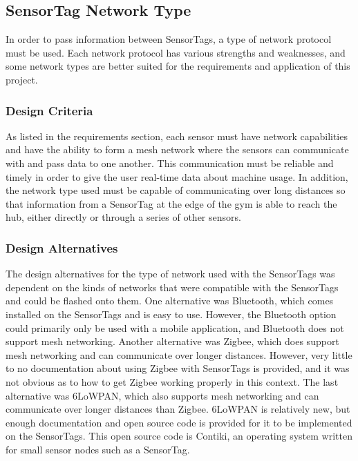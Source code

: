 \documentclass[PPFS.tex]{template/subfiles}
\begin{document}
\subsection{SensorTag Network Type}
In order to pass information between SensorTags, a type of network protocol must be used. Each network protocol has various strengths and weaknesses, and some network types are better suited for the requirements and application of this project.

\subsubsection{Design Criteria}
As listed in the requirements section, each sensor must have network capabilities and have the ability to form a mesh network where the sensors can communicate with and pass data to one another. This communication must be reliable and timely in order to give the user real-time data about machine usage. In addition, the network type used must be capable of communicating over long distances so that information from a SensorTag at the edge of the gym is able to reach the hub, either directly or through a series of other sensors.

\subsubsection{Design Alternatives}
The design alternatives for the type of network used with the SensorTags was dependent on the kinds of networks that were compatible with the SensorTags and could be flashed onto them. One alternative was Bluetooth, which comes installed on the SensorTags and is easy to use. However, the Bluetooth option could primarily only be used with a mobile application, and Bluetooth does not support mesh networking. Another alternative was Zigbee, which does support mesh networking and can communicate over longer distances. However, very little to no documentation about using Zigbee with SensorTags is provided, and it was not obvious as to how to get Zigbee working properly in this context. The last alternative was 6LoWPAN, which also supports mesh networking and can communicate over longer distances than Zigbee. 6LoWPAN is relatively new, but enough documentation and open source code is provided for it to be implemented on the SensorTags. This open source code is Contiki, an operating system written for small sensor nodes such as a SensorTag.
\end{document}
